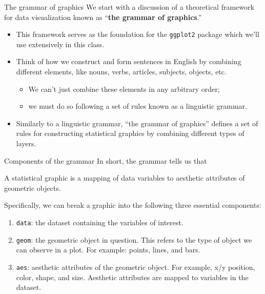 \documentclass[
  ignorenonframetext,
]{beamer}
\providecommand{\tightlist}{%
  \setlength{\itemsep}{0pt}\setlength{\parskip}{0pt}}
\begin{document}
\begin{frame}[fragile]{The grammar of graphics}
\protect\hypertarget{the-grammar-of-graphics}{}
We start with a discussion of a theoretical framework for data
visualization known as ``\textbf{the grammar of graphics}.''

\begin{itemize}
\item
  This framework serves as the foundation for the \texttt{ggplot2}
  package which we'll use extensively in this class.
\item
  Think of how we construct and form sentences in English by combining
  different elements, like nouns, verbs, articles, subjects, objects,
  etc.

  \begin{itemize}
  \tightlist
  \item
    We can't just combine these elements in any arbitrary order;
  \item
    we must do so following a set of rules known as a linguistic
    grammar.
  \end{itemize}
\item
  Similarly to a linguistic grammar, ``the grammar of graphics'' defines
  a set of rules for constructing statistical graphics by combining
  different types of layers.
\end{itemize}
\end{frame}

\begin{frame}[fragile]{Components of the grammar}
\protect\hypertarget{components-of-the-grammar}{}
In short, the grammar tells us that

\begin{tcolorbox}
A statistical graphic is a mapping of data variables to aesthetic attributes of geometric objects.
\end{tcolorbox}

Specifically, we can break a graphic into the following three essential
components:

\begin{enumerate}
\item
  \texttt{data}: the dataset containing the variables of interest.
\item
  \texttt{geom}: the geometric object in question. This refers to the
  type of object we can observe in a plot. For example: points, lines,
  and bars.
\item
  \texttt{aes}: aesthetic attributes of the geometric object. For
  example, x/y position, color, shape, and size. Aesthetic attributes
  are mapped to variables in the dataset.
\end{enumerate}
\end{frame}
\end{document}
